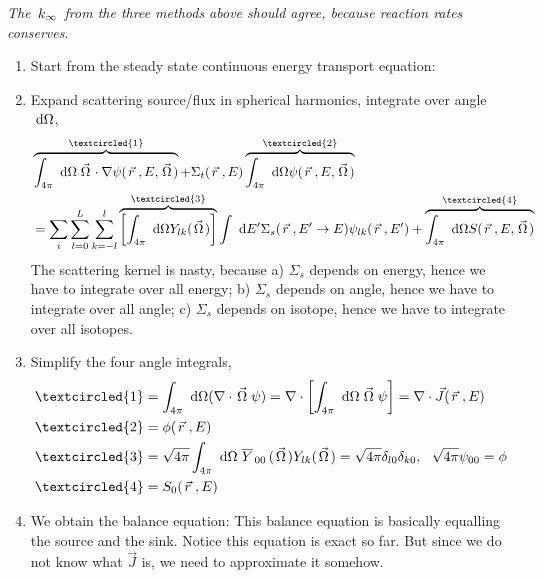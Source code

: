 \documentclass{school-22.211-notes}
\begin{document}
\textit{The $\left. k_{\infty} \right.$ from the three methods above should agree, because reaction rates conserves}.


\clearpage
{}
\begin{enumerate}
\item Start from the steady state continuous energy transport equation: 

\item Expand scattering source/flux in spherical harmonics, integrate over angle $\mbox{ }\mathrm{d} \Omega$,
\begin{align}
 &\overbrace{\int_{4\pi} \dOmega \vecOmega \cdot \gradient \psi(\vecr, E, \vecOmega)}^{\textcircled{1}} 
+ \Sigma_t (\vecr, E) \overbrace{\int_{4\pi} \dOmega \psi(\vecr, E, \vecOmega)}^{\textcircled{2}} \\
&= \Sum_i \Sum_{l=0}^L \Sum_{k=-l}^l \overbrace{\left[\int_{4\pi} \dOmega Y_{lk} (\vecOmega) \right]}^{\textcircled{3}} \int \dE' \Sigma_s(\vecr, E'\to E) \psi_{lk}(\vecr, E') + \overbrace{\int_{4\pi} \dOmega S(\vecr, E, \vecOmega)}^{\textcircled{4}} 
\end{align}
The scattering kernel is nasty, because a) $\Sigma_s$ depends on energy, hence we have to integrate over all energy; b) $\Sigma_s$ depends on angle, hence we have to integrate over all angle; c) $\Sigma_s$ depends on isotope, hence we have to integrate over all isotopes. 

\item Simplify the four angle integrals,
\begin{align}
\textcircled{1} &= \int_{4\pi} \dOmega (\divergence \vecOmega \psi) = \divergence \left[\int_{4\pi} \dOmega \vecOmega \psi \right] = \divergence \vec{J} (\vecr, E) \\
\textcircled{2} &= \phi(\vecr, E) \\
\textcircled{3} &= \sqrt{4\pi} \int_{4\pi} \dOmega \bar{Y}_{00}(\vecOmega) Y_{lk} (\vecOmega) = \sqrt{4\pi} \delta_{l0}\delta_{k0}, \fsp \fsp \sqrt{4 \pi } \psi_{00} = \phi \\
\textcircled{4} &= S_0 (\vecr, E) 
\end{align}

\item We obtain the balance equation:
This balance equation is basically equalling the source and the sink. Notice this equation is exact so far. But since we do not know what $\vec{J}$ is, we need to approximate it somehow. 
\end{enumerate}
\end{document}
